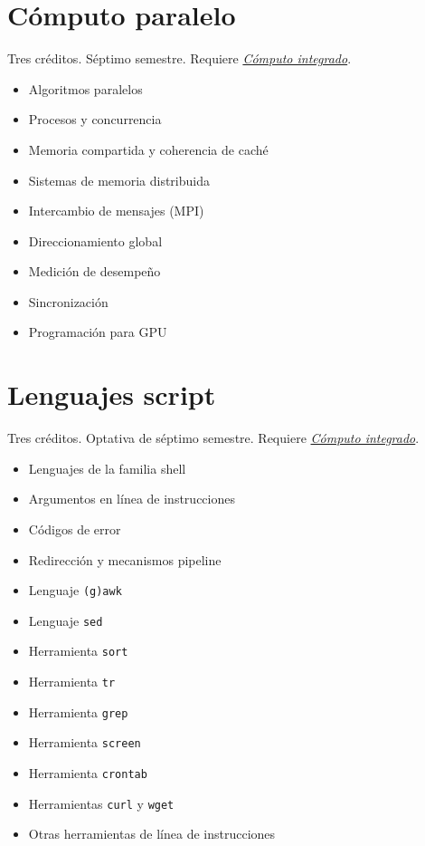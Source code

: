 \documentclass{article}
\begin{document}
\begin{multicols}{4}
\vfill\null \columnbreak

\hypertarget{cp}{\section*{C\'{o}mputo paralelo}} 

Tres cr\'{e}ditos. S\'{e}ptimo semestre. Requiere \hyperlink{ci}{\em
  C\'{o}mputo integrado}.

\begin{itemize}
\item{Algoritmos paralelos}
\item{Procesos y concurrencia}
\item{Memoria compartida y coherencia de cach\'{e}}
\item{Sistemas de memoria distribuida}
\item{Intercambio de mensajes (MPI)}
\item{Direccionamiento global}
\item{Medici\'{o}n de desempe\~{n}o}
\item{Sincronizaci\'{o}n}
\item{Programaci\'{o}n para GPU}
\end{itemize}

\vfill\null \columnbreak

\hypertarget{ls}{\section*{Lenguajes script}}

Tres cr\'{e}ditos. Optativa de s\'{e}ptimo semestre.
 Requiere \hyperlink{ci}{\em
  C\'{o}mputo integrado}.

\begin{itemize}
\item{Lenguajes de la familia shell}
\item{Argumentos en l\'{i}nea de instrucciones}
\item{C\'{o}digos de error}
\item{Redirecci\'{o}n y mecanismos pipeline}
\item{Lenguaje \texttt{(g)awk}}
\item{Lenguaje \texttt{sed}}
\item{Herramienta \texttt{sort}}  
\item{Herramienta \texttt{tr}}
\item{Herramienta \texttt{grep}}
\item{Herramienta \texttt{screen}}
\item{Herramienta \texttt{crontab}}
\item{Herramientas \texttt{curl} y \texttt{wget}}  
\item{Otras herramientas de l\'{i}nea de instrucciones}
\end{itemize}


\end{multicols}
\end{document}
